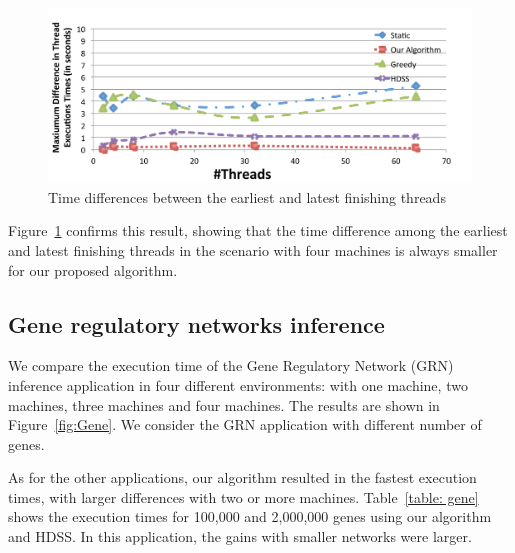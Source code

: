 \documentclass[journal]{IEEEtran}
\begin{document}
\begin{figure}[htb]
	\begin{center}
	\centering
			\includegraphics[scale=0.345]{MaximoDiferenca_black_novo.pdf}
	\caption{Time differences between the earliest and latest finishing threads}
	\label{fig:diferencaThreadsBlack}
	\end{center}
\end{figure}

Figure~\ref{fig:diferencaThreadsBlack} confirms this result, showing that the
time difference among the earliest and latest finishing threads in the
scenario with four machines is always smaller for our proposed algorithm.


\subsection{Gene regulatory networks inference}

We compare the execution time of the Gene Regulatory Network (GRN) inference
application in four different environments: with one machine, two machines,
three machines and four machines. The results are shown in
Figure~\ref{fig:Gene}. We consider the GRN application with different number of
genes.


As for the other applications, our algorithm resulted in the fastest execution
times, with larger differences with two or more machines. Table~\ref{table:
  gene} shows the execution times for 100,000 and 2,000,000 genes using our
algorithm and HDSS. In this application, the gains with smaller networks were
larger.

%
\end{document}
